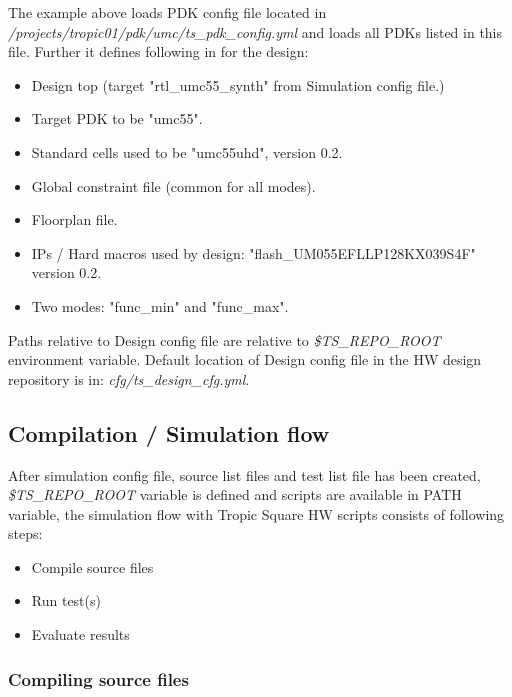 \documentclass{tropic_design_spec}
\begin{document}
The example above loads PDK config file located in \newline
\textit{/projects/tropic01/pdk/umc/ts_pdk_config.yml} and loads all PDKs listed in this file.
Further it defines following in for the design:
\begin{itemize}
    \item Design top (target "rtl_umc55_synth" from Simulation config file.)
    \item Target PDK to be "umc55".
    \item Standard cells used to be "umc55uhd", version 0.2.
    \item Global constraint file (common for all modes).
    \item Floorplan file.
    \item IPs / Hard macros used by design: "flash_UM055EFLLP128KX039S4F" version 0.2.
    \item Two modes: "func_min" and "func_max".
\end{itemize}

Paths relative to Design config file are relative to \textit{\$TS_REPO_ROOT} environment
variable. Default location of Design config file in the HW design repository is in:
\textit{cfg/ts_design_cfg.yml}.


\subsection{Compilation / Simulation flow}
\label{sec:compilation-simulation-flow}

After simulation config file, source list files and test list file has been created,
\textit{\$TS_REPO_ROOT} variable is defined and scripts are available in PATH variable,
the simulation flow with Tropic Square HW scripts consists of following steps:
\begin{itemize}
    \item{Compile source files}
    \item{Run test(s)}
    \item{Evaluate results}
\end{itemize}


\subsubsection{Compiling source files}
\label{sec:compiling-source-files}
\end{document}
